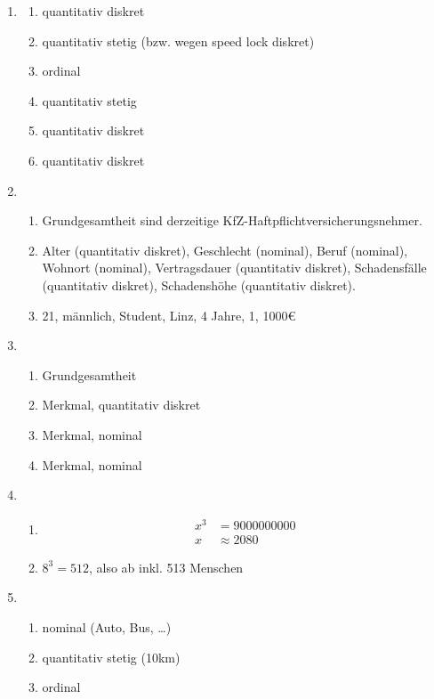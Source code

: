 \documentclass{article}
\begin{document}
\begin{enumerate}
    \item \begin{multicols}{2}
        \begin{enumerate}
            \item quantitativ diskret
            \item quantitativ stetig (bzw. wegen speed lock diskret)
            \item ordinal
            \item quantitativ stetig
            \item quantitativ diskret
            \item quantitativ diskret
        \end{enumerate}
    \end{multicols}

    \item \begin{enumerate}
        \item Grundgesamtheit sind derzeitige KfZ-Haftpflichtversicherungsnehmer.
        \item Alter (quantitativ diskret), Geschlecht (nominal), Beruf (nominal), Wohnort (nominal), Vertragsdauer (quantitativ diskret), Schadensfälle (quantitativ diskret), Schadenshöhe (quantitativ diskret).
        \item 21, männlich, Student, Linz, 4 Jahre, 1, 1000€
    \end{enumerate}

    \item \begin{enumerate}
        \item Grundgesamtheit
        \item Merkmal, quantitativ diskret
        \item Merkmal, nominal
        \item Merkmal, nominal
    \end{enumerate}

    \item \begin{enumerate}
        \item \begin{align*}
            x^3 &= 9000000000 \\
            x &\approx 2080
        \end{align*}
        \item $8^3 = 512$, also ab inkl. 513 Menschen
    \end{enumerate}

    \item \begin{enumerate}
        \item nominal (Auto, Bus, \ldots)
        \item quantitativ stetig (10km)
        \item ordinal
    \end{enumerate}


\end{enumerate}
\end{document}
